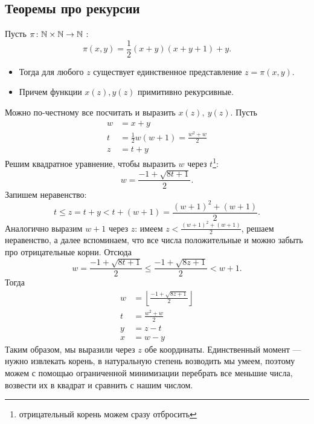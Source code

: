 \subsection{Теоремы про рекурсии}
\begin{thm}
    Пусть $ \pi\colon \mathbb{N} \times \mathbb{N} \to  \mathbb{N}$ :
	\[
		\pi(x, y) = \frac{1}{2}(x+y) (x+y+1)+y
	.\] 
	\begin{itemize}
	\item
	Тогда для любого $ z$ существует единственное представление $ z = \pi(x, y)$.
\item Причем функции $ x(z), y(z)$ примитивно рекурсивные.
	\end{itemize}
\end{thm}
\begin{proof*}
 Можно по-честному все посчитать и выразить $ x(z), ~y(z)$.
	Пусть 
	\[
	\begin{aligned}
		w &= x+y \\
		t &= \frac{1}{2}w(w+1) = \frac{w^2+w}{2} \\
		z &= t +y
	\end{aligned}
	\]
	Решим квадратное уравнение, чтобы выразить $ w$ через $ t$\footnote{отрицательный корень можем сразу отбросить}:
	\[
		w = \frac{-1 + \sqrt{ 8t + 1}}{2}
	.\] 
	Запишем неравенство:
	\[
		t \le z = t + y < t + (w +1) = \frac{(w+1)^2+(w+1)}{2}
	.\] 
	Аналогично выразим $ w+1$ через $ z$: имеем $ z < \frac{(w+1)^2+(w+1)}{2}$, решаем неравенство, а далее вспоминаем, что все числа положительные и можно забыть про отрицательные корни.
	Отсюда
	\[
		w = \frac{-1 + \sqrt{ 8t + 1}}{2} \le \frac{-1  + \sqrt{ 8z +1} }{2} < w+1
	.\] 
	Тогда 
	\[
	\begin{aligned}
		w &= \left\lfloor \frac{-1 + \sqrt{ 8z+1} }{2} \right\rfloor \\
		t &= \frac{w^2+w}{2} \\
		y &= z - t \\
		x &= w - y
	\end{aligned}
	\]
	Таким образом, мы выразили через $ z$ обе координаты. Единственный момент --- нужно извлекать корень, в натуральную степень возводить мы умеем, поэтому можем с помощью ограниченной минимизации перебрать все меньшие числа, возвести их в квадрат и сравнить с нашим числом.
\end{proof*}


